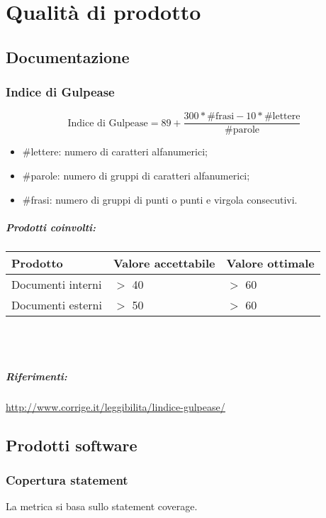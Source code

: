 \documentclass[a4paper, 12pt]{article}
\begin{document}
\makefrontpage

\makeversioni

\tableofcontents
\clearpage

\section{Qualità di prodotto}

\subsection{Documentazione}
\subsubsection{Indice di Gulpease}
\[ \text{Indice di Gulpease} = 89 + \frac{300*\text{\#frasi} - 10*\text{\#lettere}}{\text{\#parole}} \]
\begin{itemize}
	\item \#lettere: numero di caratteri alfanumerici;
	\item \#parole: numero di gruppi di caratteri alfanumerici;
	\item \#frasi: numero di gruppi di punti o punti e virgola consecutivi.
\end{itemize}

\subparagraph{Prodotti coinvolti:}
\begin{center}
	\begin{tabularx}{\textwidth}{|X|X|X|}
		\hline
		\textbf{Prodotto} & \textbf{Valore accettabile} & \textbf{Valore ottimale } \\
		\hline
		Documenti interni & $>$ 40                      & $>$ 60                    \\
		\hline
		Documenti esterni & $>$ 50                      & $>$ 60                    \\
		\hline
	\end{tabularx}\\[8pt]
	\mbox{}\\
\end{center}

\subparagraph{Riferimenti:} \underline{\href{http://www.corrige.it/leggibilita/lindice-gulpease/}{http://www.corrige.it/leggibilita/lindice-gulpease/}}

\subsection{Prodotti software}

\subsubsection{Copertura statement}
La metrica si basa sullo statement coverage.
\end{document}
